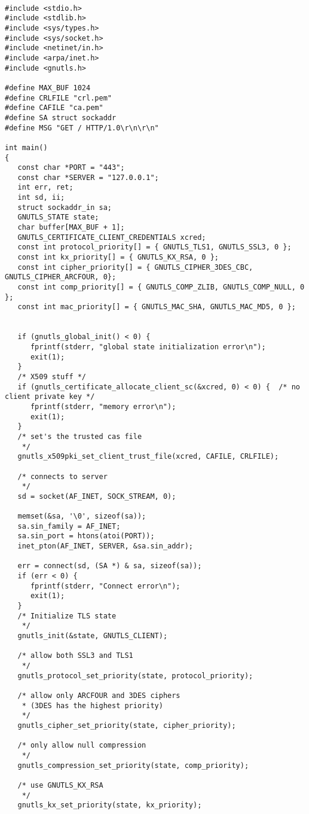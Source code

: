 \begin{verbatim}

#include <stdio.h>
#include <stdlib.h>
#include <sys/types.h>
#include <sys/socket.h>
#include <netinet/in.h>
#include <arpa/inet.h>
#include <gnutls.h>

#define MAX_BUF 1024
#define CRLFILE "crl.pem"
#define CAFILE "ca.pem"
#define SA struct sockaddr
#define MSG "GET / HTTP/1.0\r\n\r\n"

int main()
{
   const char *PORT = "443";
   const char *SERVER = "127.0.0.1";
   int err, ret;
   int sd, ii;
   struct sockaddr_in sa;
   GNUTLS_STATE state;
   char buffer[MAX_BUF + 1];
   GNUTLS_CERTIFICATE_CLIENT_CREDENTIALS xcred;
   const int protocol_priority[] = { GNUTLS_TLS1, GNUTLS_SSL3, 0 };
   const int kx_priority[] = { GNUTLS_KX_RSA, 0 };
   const int cipher_priority[] = { GNUTLS_CIPHER_3DES_CBC, GNUTLS_CIPHER_ARCFOUR, 0};
   const int comp_priority[] = { GNUTLS_COMP_ZLIB, GNUTLS_COMP_NULL, 0 };
   const int mac_priority[] = { GNUTLS_MAC_SHA, GNUTLS_MAC_MD5, 0 };


   if (gnutls_global_init() < 0) {
      fprintf(stderr, "global state initialization error\n");
      exit(1);
   }
   /* X509 stuff */
   if (gnutls_certificate_allocate_client_sc(&xcred, 0) < 0) {  /* no client private key */
      fprintf(stderr, "memory error\n");
      exit(1);
   }
   /* set's the trusted cas file
    */
   gnutls_x509pki_set_client_trust_file(xcred, CAFILE, CRLFILE);

   /* connects to server 
    */
   sd = socket(AF_INET, SOCK_STREAM, 0);

   memset(&sa, '\0', sizeof(sa));
   sa.sin_family = AF_INET;
   sa.sin_port = htons(atoi(PORT));
   inet_pton(AF_INET, SERVER, &sa.sin_addr);

   err = connect(sd, (SA *) & sa, sizeof(sa));
   if (err < 0) {
      fprintf(stderr, "Connect error\n");
      exit(1);
   }
   /* Initialize TLS state 
    */
   gnutls_init(&state, GNUTLS_CLIENT);

   /* allow both SSL3 and TLS1
    */
   gnutls_protocol_set_priority(state, protocol_priority);

   /* allow only ARCFOUR and 3DES ciphers
    * (3DES has the highest priority)
    */
   gnutls_cipher_set_priority(state, cipher_priority);

   /* only allow null compression
    */
   gnutls_compression_set_priority(state, comp_priority);

   /* use GNUTLS_KX_RSA
    */
   gnutls_kx_set_priority(state, kx_priority);


\end{verbatim}

